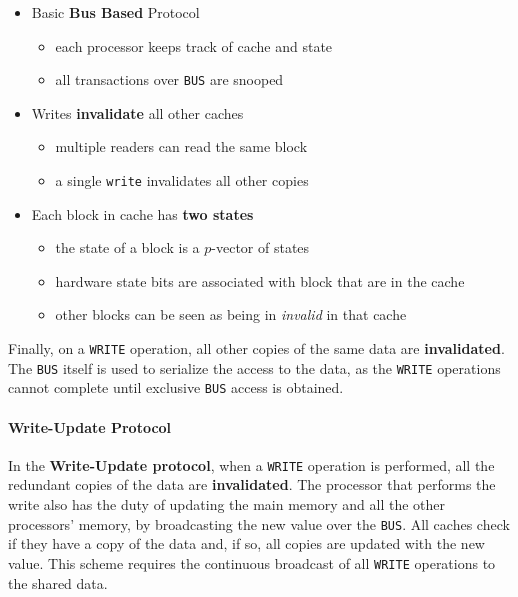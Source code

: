 \documentclass[english]{article}
\begin{document}
\begin{itemize}
  \item Basic \textbf{Bus Based} Protocol
        \begin{itemize}
          \item each processor keeps track of cache and state
          \item all transactions over \texttt{BUS} are snooped
        \end{itemize}
  \item Writes \textbf{invalidate} all other caches
        \begin{itemize}
          \item multiple readers can read the same block
          \item a single \texttt{write} invalidates all other copies
        \end{itemize}
  \item Each block in cache has \textbf{two states}
        \begin{itemize}
          \item the state of a block is a \(p\)-vector of states
          \item hardware state bits are associated with block that are in the cache
          \item other blocks can be seen as being in \textit{invalid} in that cache
        \end{itemize}
\end{itemize}

Finally, on a \texttt{WRITE} operation, all other copies of the same data are \textbf{invalidated}.
The \texttt{BUS} itself is used to serialize the access to the data, as the \texttt{WRITE} operations cannot complete until exclusive \texttt{BUS} access is obtained.

\paragraph{Write-Update Protocol}

In the \textbf{Write-Update protocol}, when a \texttt{WRITE} operation is performed, all the redundant copies of the data are \textbf{invalidated}.
The processor that performs the write also has the duty of updating the main memory and all the other processors' memory, by broadcasting the new value over the \texttt{BUS}.
All caches check if they have a copy of the data and, if so, all copies are updated with the new value.
This scheme requires the continuous broadcast of all \texttt{WRITE} operations to the shared data.
\end{document}
